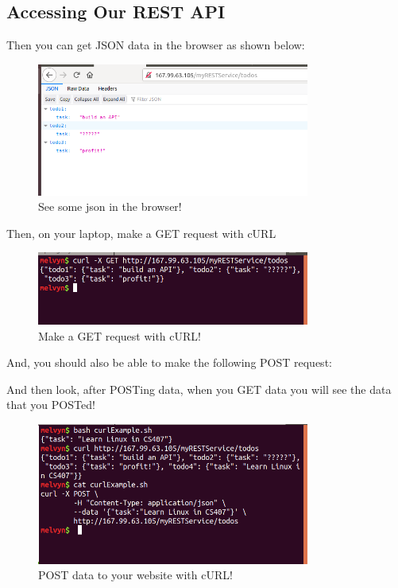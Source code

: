 \documentclass[10pt]{article}
\begin{document}


\subsection{Accessing Our REST API}
Then you can get JSON data in the browser as shown below:

\begin{figure}[h]
  \centering
    \includegraphics[width=0.8\textwidth]{restInBrowser.png}
  \caption{See some json in the browser!}
\end{figure}

Then, on your laptop, make a GET request with cURL


\begin{figure}[h]
  \centering
    \includegraphics[width=0.8\textwidth]{curlYourAPI.png}
  \caption{Make a GET request with cURL!}
\end{figure}

And, you should also be able to make the following POST request:



And then look, after POSTing data, when you GET data you will see the data that you POSTed!

\begin{figure}[h]
  \centering
    \includegraphics[width=0.8\textwidth]{addedToTODOList.png}
  \caption{POST data to your website with cURL!}
\end{figure}
\end{document}
